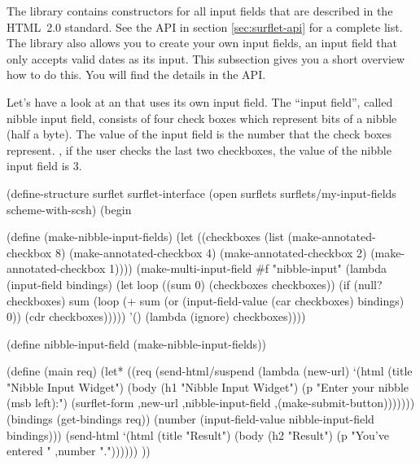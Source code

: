 The \surflet library contains constructors for all input fields that
are described in the HTML~2.0 standard.  See the \surflet API in
section \ref{sec:surflet-api} for a complete list.  The \surflet
library also allows you to create your own input fields, \eg an input
field that only accepts valid dates as its input.  This subsection
gives you a short overview how to do this.  You will find the details
in the \surflet API.

Let's have a look at an \surflet that uses its own input field.  The
``input field'', called nibble input field, consists of four check
boxes which represent bits of a nibble (half a byte).  The value of
the input field is the number that the check boxes represent.  \Eg, if
the user checks the last two checkboxes, the value of the nibble input
field is 3.

\begin{listing}
(define-structure surflet surflet-interface
  (open surflets
        surflets/my-input-fields
        scheme-with-scsh)
  (begin

    (define (make-nibble-input-fields)
      (let ((checkboxes (list (make-annotated-checkbox 8)
                              (make-annotated-checkbox 4)
                              (make-annotated-checkbox 2)
                              (make-annotated-checkbox 1))))
        (make-multi-input-field
         #f "nibble-input"
         (lambda (input-field bindings)
           (let loop ((sum 0)
                      (checkboxes checkboxes))
             (if (null? checkboxes)
                 sum
                 (loop (+ sum (or (input-field-value (car checkboxes) 
                                                     bindings)
                                  0))
                       (cdr checkboxes)))))
         '()
         (lambda (ignore)
           checkboxes))))

    (define nibble-input-field (make-nibble-input-fields))

    (define (main req)
      (let* ((req (send-html/suspend
                   (lambda (new-url)
                     `(html (title "Nibble Input Widget")
                            (body 
                             (h1 "Nibble Input Widget")
                             (p "Enter your nibble (msb left):")
                             (surflet-form ,new-url
                                           ,nibble-input-field
                                           ,(make-submit-button)))))))
             (bindings (get-bindings req))
             (number (input-field-value nibble-input-field bindings)))
        (send-html
         `(html (title "Result")
                (body 
                 (h2 "Result")
                 (p "You've entered " ,number "."))))))
    ))
\end{listing}

